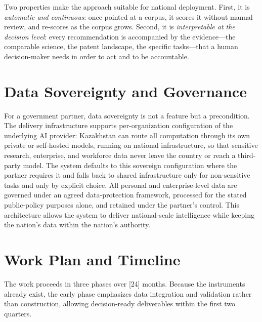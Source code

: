 \documentclass[11pt]{article}
\begin{document}
Two properties make the approach suitable for national deployment. First, it is
\emph{automatic and continuous}: once pointed at a corpus, it scores it without
manual review, and re-scores as the corpus grows. Second, it is
\emph{interpretable at the decision level}: every recommendation is accompanied
by the evidence---the comparable science, the patent landscape, the specific
tasks---that a human decision-maker needs in order to act and to be accountable.

\section{Data Sovereignty and Governance}
\label{sec:sovereignty}

For a government partner, data sovereignty is not a feature but a precondition.
The delivery infrastructure supports per-organization configuration of the
underlying AI provider: Kazakhstan can route all computation through its own
private or self-hosted models, running on national infrastructure, so that
sensitive research, enterprise, and workforce data never leave the country or
reach a third-party model. The system defaults to this sovereign configuration
where the partner requires it and falls back to shared infrastructure only for
non-sensitive tasks and only by explicit choice. All personal and
enterprise-level data are governed under an agreed data-protection framework,
processed for the stated public-policy purposes alone, and retained under the
partner's control. This architecture allows the system to deliver national-scale
intelligence while keeping the nation's data within the nation's authority.

\section{Work Plan and Timeline}

The work proceeds in three phases over [24] months. Because the instruments
already exist, the early phase emphasizes data integration and validation rather
than construction, allowing decision-ready deliverables within the first two
quarters.
\end{document}
